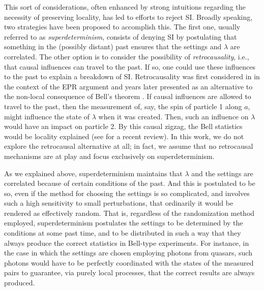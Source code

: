 \documentclass[letterpaper,12pt]{article}
\begin{document}
This sort of considerations, often enhanced by strong intuitions regarding the necessity of preserving locality, has led to efforts to reject SI. Broadly speaking, two strategies have been proposed to accomplish this. The first one, usually referred to as \emph{superdeterminism}, consists of denying SI by postulating that something in the (possibly distant) past ensures that the settings and $\lambda$ are correlated. The other option is to consider the possibility of \emph{retrocausality}, i.e., that causal influences can travel to the past. If so, one could use these influences to the past to explain a breakdown of SI. Retrocausality was first considered in \cite{Cos1953} in the context of the EPR argument and years later presented as an alternative to the non-local consequence of Bell's theorem \cite{Cos1977}. If causal influences are allowed to travel to the past, then the measurement of, say, the spin of particle 1 along $a$, might influence the state of $\lambda$ when it was created. Then, such an influence on $ \lambda $ would have an impact on particle 2. By this causal zigzag, the Bell statistics would be locality explained (see \cite{Whar} for a recent review). In this work, we do not explore the retrocausal alternative at all; in fact, we assume that no retrocausal mechanisms are at play and focus exclusively on superdeterminism.

As we explained above, superdeterminism maintains that $ \lambda $ and the settings are correlated because of certain conditions of the past. And this is postulated to be so, even if the method for choosing the settings is so complicated, and involves such a high sensitivity to small perturbations, that ordinarily it would be rendered as effectively random. That is, regardless of the randomization method employed, superdeterminism postulates the settings to be determined by the conditions at some past time, and to be distributed in such a way that they always produce the correct statistics in Bell-type experiments. For instance, in the case in which the settings are chosen employing photons from quasars, such photons would have to be perfectly coordinated with the states of the measured pairs to guarantee, via purely local processes, that the correct results are always produced.
\end{document}
